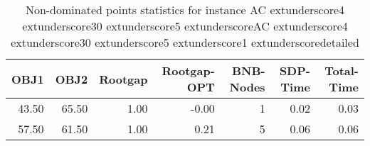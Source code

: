 \begin{table}
\caption{Non-dominated points statistics for instance AC	extunderscore4	extunderscore30	extunderscore5	extunderscoreAC	extunderscore4	extunderscore30	extunderscore5	extunderscore1	extunderscoredetailed}
\label{tab:stats/AC_4_30_5_AC_4_30_5_1_detailed}
\begin{tabular}{rrrrrrr}
\toprule
OBJ1 & OBJ2 & Rootgap & Rootgap-OPT & BNB-Nodes & SDP-Time & Total-Time \\
\midrule
43.50 & 65.50 & 1.00 & -0.00 & 1 & 0.02 & 0.03 \\
57.50 & 61.50 & 1.00 & 0.21 & 5 & 0.06 & 0.06 \\
\bottomrule
\end{tabular}
\end{table}
